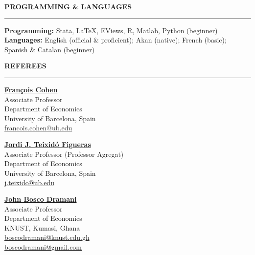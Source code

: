 \documentclass{resume} %
\def\sectionskip{\vspace{4pt}}
\def\sectionlineskip{\smallskip}
\renewenvironment{rSection}[1]{%
  \sectionskip
  \MakeUppercase{{\bf #1}}%
  \sectionlineskip
  \hrule
  \begin{list}{}{\setlength{\leftmargin}{0em}\setlength{\topsep}{5pt}\setlength{\itemsep}{0pt}\setlength{\parsep}{0pt}}%
  \item[]
}{%
  \end{list}
}
\begin{document}
\begin{rSection}{Programming \& Languages}
\textbf{Programming:} Stata, LaTeX, EViews, R, Matlab, Python (beginner)\\
\textbf{Languages:} English (official \& proficient); Akan (native); French (basic); Spanish \& Catalan \mbox{(beginner)}
\end{rSection}


\begin{rSection}{Referees}
\begin{minipage}[t]{0.32\textwidth}\raggedright
\href{https://sites.google.com/site/francoiscoheneconomist/home}{\textbf{François Cohen}}\\
Associate Professor\\
Department of Economics\\
University of Barcelona, Spain\\
\href{mailto:francois.cohen@ub.edu}{francois.cohen@ub.edu}
\end{minipage}\hfill
\begin{minipage}[t]{0.32\textwidth}\raggedright
\href{https://www.ub.edu/gim/members/jordi-teixido/}{\textbf{Jordi J. Teixidó Figueras}}\\
Associate Professor (Professor Agregat)\\
Department of Economics\\
University of Barcelona, Spain\\
\href{mailto:j.teixido@ub.edu}{j.teixido@ub.edu}
\end{minipage}\hfill
\begin{minipage}[t]{0.32\textwidth}\raggedright
\href{https://webapps.knust.edu.gh/staff/dirsearch/profile/summary/6d10a9a25ebf.html}{\textbf{John Bosco Dramani}}\\
Associate Professor\\
Department of Economics\\
KNUST, Kumasi, Ghana\\
\href{mailto:boscodramani@knust.edu.gh}{boscodramani@knust.edu.gh}\\
\href{mailto:boscodramani@gmail.com}{boscodramani@gmail.com}
\end{minipage}
\end{rSection}
\end{document}

